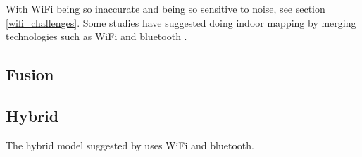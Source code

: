 With WiFi being so inaccurate and being so sensitive to noise, see section \ref{wifi_challenges}.
Some studies have suggested doing indoor mapping by merging technologies such as WiFi and bluetooth \cite{hybrid_wifi_bluetooth} \cite{fusion_wifi_bluetooth}.

\subsection{Fusion}

\subsection{Hybrid}
The hybrid model suggested by \citet{hybrid_wifi_bluetooth} uses WiFi and bluetooth.